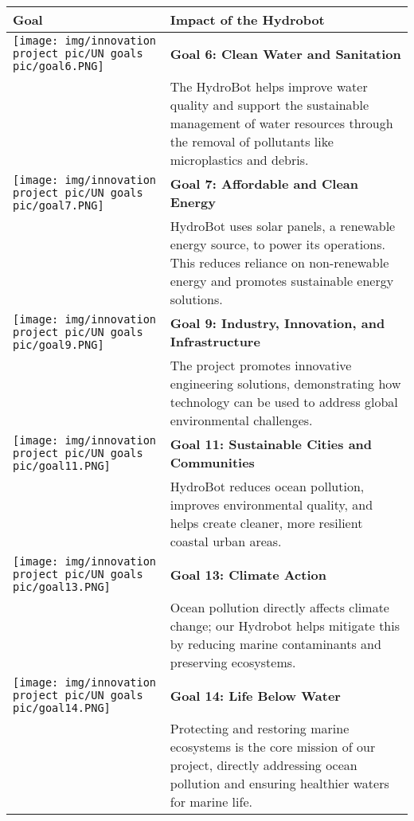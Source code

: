 \renewcommand{\arraystretch}{0.8} 
\setlength{\tabcolsep}{5pt} %
\begin{longtable}{|m{3.5cm}|m{13cm}|} %

    \hline
    \textbf{Goal} & \textbf{Impact of the Hydrobot} \\
    \hline
    \centering \texttt{[image: img/innovation project pic/UN goals pic/goal6.PNG]} & \large \textbf{Goal 6: Clean Water and Sanitation} \\ 
    & \vspace{-0,2pt}  The HydroBot  helps improve water quality and support the sustainable management of water resources through the removal of pollutants like microplastics and debris. \\
    \hline
    \centering \texttt{[image: img/innovation project pic/UN goals pic/goal7.PNG]} &  \large\textbf{Goal 7: Affordable and Clean Energy} \\ 
    & \vspace{-0,2pt} HydroBot uses solar panels, a renewable energy source, to power its operations. This reduces reliance on non-renewable energy and promotes sustainable energy solutions.  \\
    \hline
    \centering \texttt{[image: img/innovation project pic/UN goals pic/goal9.PNG]} &  \large\textbf{Goal 9: Industry, Innovation, and Infrastructure} \\ 
    & \vspace{-0,2pt} The project promotes innovative engineering solutions, demonstrating how technology can be used to address global environmental challenges. \\
    \hline
    \centering \texttt{[image: img/innovation project pic/UN goals pic/goal11.PNG]} & \large\textbf{Goal 11: Sustainable Cities and Communities} \\ 
    & \vspace{-0,2pt} HydroBot reduces ocean pollution, improves environmental quality, and helps create cleaner, more resilient coastal urban areas. \\
    \hline
    \centering \texttt{[image: img/innovation project pic/UN goals pic/goal13.PNG]} &  \large\textbf{Goal 13: Climate Action} \\ 
    & \vspace{-0,2pt} Ocean pollution directly affects climate change; our Hydrobot helps mitigate this by reducing marine contaminants and preserving ecosystems. \\
    \hline
    \centering \texttt{[image: img/innovation project pic/UN goals pic/goal14.PNG]} &  \large\textbf{Goal 14: Life Below Water} \\ 
    & \vspace{-0,2pt} Protecting and restoring marine ecosystems is the core mission of our project, directly addressing ocean pollution and ensuring healthier waters for marine life. \\
    \hline

\end{longtable}


